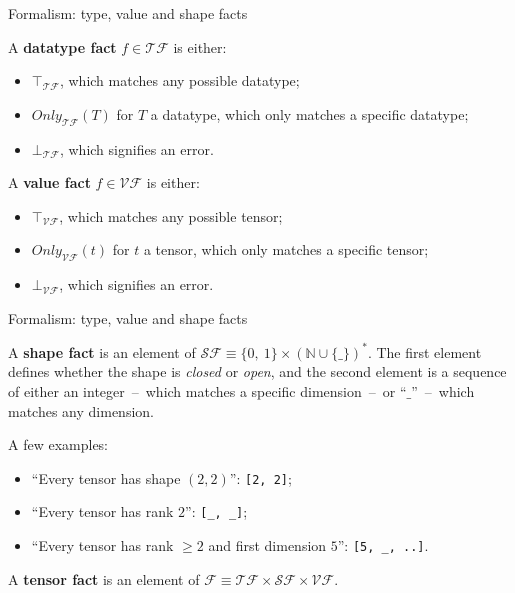 \documentclass{beamer}
\begin{document}
\begin{frame}{Formalism: type, value and shape facts}
\small
\begin{definition}
A \textbf{datatype fact} $f \in \mathcal{TF}$ is either:
\begin{itemize}
    \setlength\itemsep{0em}
    \item $\top_\mathcal{TF}$, which matches any possible datatype;
    \item $Only_\mathcal{TF}(T)$ for $T$ a datatype, which only matches a specific datatype;
    \item $\bot_\mathcal{TF}$, which signifies an error.
\end{itemize}
\end{definition}

\begin{definition}
A \textbf{value fact} $f \in \mathcal{VF}$ is either:
\begin{itemize}
    \setlength\itemsep{0em}
    \item $\top_\mathcal{VF}$, which matches any possible tensor;
    \item $Only_\mathcal{VF}(t)$ for $t$ a tensor, which only matches a specific tensor;
    \item $\bot_\mathcal{VF}$, which signifies an error.
\end{itemize}
\end{definition}
\end{frame}

\begin{frame}{Formalism: type, value and shape facts}
\small
\begin{definition}
A \textbf{shape fact} is an element of $\mathcal{SF} \equiv \{0,\ 1\} \times \left(\mathbb{N} \cup \{\_\}\right)^*$. The first element defines whether the shape is \textit{closed} or \textit{open}, and the second element is a sequence of either an integer~--~which matches a specific dimension~--~or ``$\_$''~--~which matches any dimension.
\end{definition}

\vspace{.5em}
A few examples:
\begin{itemize}
    \setlength\itemsep{0em}
    \item<1-> ``Every tensor has shape $(2, 2)$'': \texttt{[2, 2]};
    \item<2-> ``Every tensor has rank $2$'': \texttt{[\_, \_]};
    \item<3-> ``Every tensor has rank $\geq 2$ and first dimension $5$'': \texttt{[5, \_, ..]}.
\end{itemize}

\vspace{.5em}
{\begin{definition}
A \textbf{tensor fact} is an element of $\mathcal{F} \equiv \mathcal{TF} \times \mathcal{SF} \times \mathcal{VF}$.
\end{definition}}
\end{frame}
\end{document}
